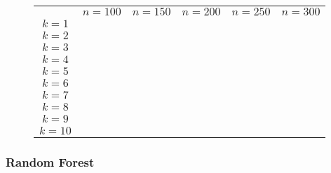\begin{figure}
    \begin{tabular}{cccccc}
               & $n=100$ & $n=150$ & $n=200$ & $n=250$ & $n=300$ \\
        $k=1$  &         &         &         &         &         \\
        $k=2$  &         &         &         &         &         \\
        $k=3$  &         &         &         &         &         \\
        $k=4$  &         &         &         &         &         \\
        $k=5$  &         &         &         &         &         \\
        $k=6$  &         &         &         &         &         \\
        $k=7$  &         &         &         &         &         \\
        $k=8$  &         &         &         &         &         \\
        $k=9$  &         &         &         &         &         \\
        $k=10$ &         &         &         &         &
    \end{tabular}
\end{figure}

\subsubsection{Random Forest}
